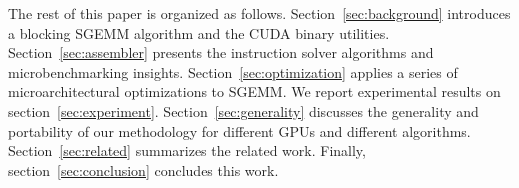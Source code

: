 The rest of this paper is organized as follows. Section~\ref{sec:background} introduces 
a blocking SGEMM algorithm and the CUDA binary utilities.
Section~\ref{sec:assembler} presents the instruction solver algorithms and
microbenchmarking 
insights. Section~\ref{sec:optimization} applies a series of microarchitectural optimizations to SGEMM. We report 
experimental results on section~\ref{sec:experiment}.
Section~\ref{sec:generality} discusses the generality and portability of our methodology for different GPUs and different algorithms.
Section~\ref{sec:related} summarizes the related work. Finally, 
section~\ref{sec:conclusion} concludes this work. 
